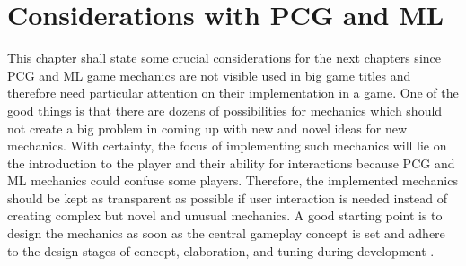 \documentclass[MGS,Master,english]{twbook}%
\begin{document}
\section{Considerations with \acl{PCG} and \acl{ML}} \label{mechanicsConsiderationsPCGandML}
This chapter shall state some crucial considerations for the next chapters since \ac{PCG} and \ac{ML} game mechanics are not visible used in big game titles and therefore need particular attention on their implementation in a game. One of the good things is that there are dozens of possibilities for mechanics which should not create a big problem in coming up with new and novel ideas for new mechanics. With certainty, the focus of implementing such mechanics will lie on the introduction to the player and their ability for interactions because \ac{PCG} and \ac{ML} mechanics could confuse some players. Therefore, the implemented mechanics should be kept as transparent as possible if user interaction is needed instead of creating complex but novel and unusual mechanics. A good starting point is to design the mechanics as soon as the central gameplay concept is set and adhere to the design stages of concept, elaboration, and tuning during development \cite{gameDesign::gameMechanicsAdvancedGameDesign}.
\end{document}
